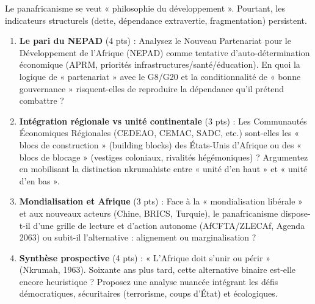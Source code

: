 \documentclass[11pt]{article}
\begin{document}
\begin{exercice}
Le panafricanisme se veut « philosophie du développement ». Pourtant, les indicateurs structurels (dette, dépendance extravertie, fragmentation) persistent.
\begin{enumerate}
    \item \textbf{Le pari du NEPAD} (4 pts) : Analysez le Nouveau Partenariat pour le Développement de l'Afrique (NEPAD) comme tentative d'auto-détermination économique (APRM, priorités infrastructures/santé/éducation). En quoi la logique de « partenariat » avec le G8/G20 et la conditionnalité de « bonne gouvernance » risquent-elles de reproduire la dépendance qu'il prétend combattre ?
    \item \textbf{Intégration régionale vs unité continentale} (3 pts) : Les Communautés Économiques Régionales (CEDEAO, CEMAC, SADC, etc.) sont-elles les « blocs de construction » (building blocks) des États-Unis d'Afrique ou des « blocs de blocage » (vestiges coloniaux, rivalités hégémoniques) ? Argumentez en mobilisant la distinction nkrumahiste entre « unité d'en haut » et « unité d'en bas ».
    \item \textbf{Mondialisation et Afrique} (3 pts) : Face à la « mondialisation libérale » et aux nouveaux acteurs (Chine, BRICS, Turquie), le panafricanisme dispose-t-il d'une grille de lecture et d'action autonome (AfCFTA/ZLECAf, Agenda 2063) ou subit-il l'alternative : alignement ou marginalisation ?
    \item \textbf{Synthèse prospective} (4 pts) : « L'Afrique doit s'unir ou périr » (Nkrumah, 1963). Soixante ans plus tard, cette alternative binaire est-elle encore heuristique ? Proposez une analyse nuancée intégrant les défis démocratiques, sécuritaires (terrorisme, coups d'État) et écologiques.
\end{enumerate}
\end{exercice}
\end{document}
